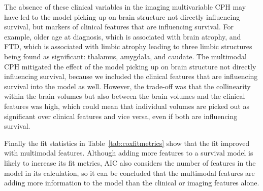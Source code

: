 The absence of these clinical variables in the imaging multivariable CPH may have led to the model picking up on brain structure not directly influencing survival, but markers of clinical features that are influencing survival.
For example, older age at diagnosis, which is associated with brain atrophy, and FTD, which is associated with limbic atrophy leading to three limbic structures being found as significant: thalamus, amygdala, and caudate.
The multimodal CPH mitigated the effect of the model picking up on brain structure not directly influencing survival, because we included the clinical features that are influencing survival into the model as well.
However, the trade-off was that the collinearity within the brain volumes but also between the brain volumes and the clinical features was high, which could mean that individual volumes are picked out as significant over clinical features and vice versa, even if both are influencing survival.

Finally the fit statistics in Table~\ref{tab:coxfitmetrics} show that the fit improved with multimodal features.
Although adding more features to a survival model is likely to increase its fit metrics, AIC also considers the number of features in the model in its calculation, so it can be concluded that the multimodal features are adding more information to the model than the clinical or imaging features alone.

